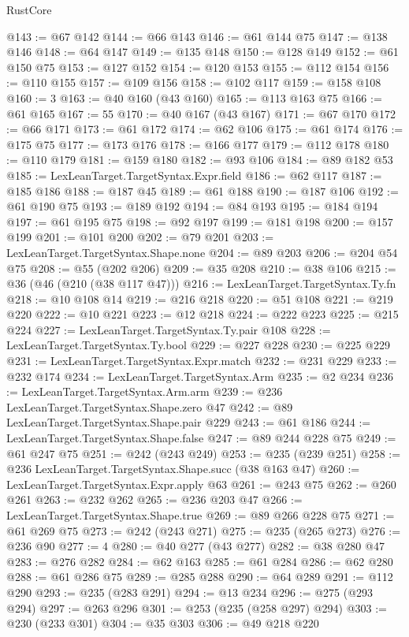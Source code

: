 \begin{lexlean}{RustCore}
\begin{coremodule}
@143 := @67 @142
@144 := @66 @143
@146 := @61 @144 @75
@147 := @138 @146
@148 := @64 @147
@149 := @135 @148
@150 := @128 @149
@152 := @61 @150 @75
@153 := @127 @152
@154 := @120 @153
@155 := @112 @154
@156 := @110 @155
@157 := @109 @156
@158 := @102 @117
@159 := @158 @108
@160 := 3
@163 := @40 @160 (@43 @160)
@165 := @113 @163 @75
@166 := @61 @165
@167 := 55
@170 := @40 @167 (@43 @167)
@171 := @67 @170
@172 := @66 @171
@173 := @61 @172
@174 := @62 @106
@175 := @61 @174
@176 := @175 @75
@177 := @173 @176
@178 := @166 @177
@179 := @112 @178
@180 := @110 @179
@181 := @159 @180
@182 := @93 @106
@184 := @89 @182 @53
@185 := LexLeanTarget.TargetSyntax.Expr.field
@186 := @62 @117
@187 := @185 @186
@188 := @187 @45
@189 := @61 @188
@190 := @187 @106
@192 := @61 @190 @75
@193 := @189 @192
@194 := @84 @193
@195 := @184 @194
@197 := @61 @195 @75
@198 := @92 @197
@199 := @181 @198
@200 := @157 @199
@201 := @101 @200
@202 := @79 @201
@203 := LexLeanTarget.TargetSyntax.Shape.none
@204 := @89 @203
@206 := @204 @54 @75
@208 := @55 (@202 @206)
@209 := @35 @208
@210 := @38 @106
@215 := @36 (@46 (@210 (@38 @117 @47)))
@216 := LexLeanTarget.TargetSyntax.Ty.fn
@218 := @10 @108 @14
@219 := @216 @218
@220 := @51 @108
@221 := @219 @220
@222 := @10 @221
@223 := @12 @218
@224 := @222 @223
@225 := @215 @224
@227 := LexLeanTarget.TargetSyntax.Ty.pair @108
@228 := LexLeanTarget.TargetSyntax.Ty.bool
@229 := @227 @228
@230 := @225 @229
@231 := LexLeanTarget.TargetSyntax.Expr.match
@232 := @231 @229
@233 := @232 @174
@234 := LexLeanTarget.TargetSyntax.Arm
@235 := @2 @234
@236 := LexLeanTarget.TargetSyntax.Arm.arm
@239 := @236 LexLeanTarget.TargetSyntax.Shape.zero @47
@242 := @89 LexLeanTarget.TargetSyntax.Shape.pair @229
@243 := @61 @186
@244 := LexLeanTarget.TargetSyntax.Shape.false
@247 := @89 @244 @228 @75
@249 := @61 @247 @75
@251 := @242 (@243 @249)
@253 := @235 (@239 @251)
@258 := @236 LexLeanTarget.TargetSyntax.Shape.succ (@38 @163 @47)
@260 := LexLeanTarget.TargetSyntax.Expr.apply @63
@261 := @243 @75
@262 := @260 @261
@263 := @232 @262
@265 := @236 @203 @47
@266 := LexLeanTarget.TargetSyntax.Shape.true
@269 := @89 @266 @228 @75
@271 := @61 @269 @75
@273 := @242 (@243 @271)
@275 := @235 (@265 @273)
@276 := @236 @90
@277 := 4
@280 := @40 @277 (@43 @277)
@282 := @38 @280 @47
@283 := @276 @282
@284 := @62 @163
@285 := @61 @284
@286 := @62 @280
@288 := @61 @286 @75
@289 := @285 @288
@290 := @64 @289
@291 := @112 @290
@293 := @235 (@283 @291)
@294 := @13 @234
@296 := @275 (@293 @294)
@297 := @263 @296
@301 := @253 (@235 (@258 @297) @294)
@303 := @230 (@233 @301)
@304 := @35 @303
@306 := @49 @218 @220

\end{coremodule}
\end{lexlean}

